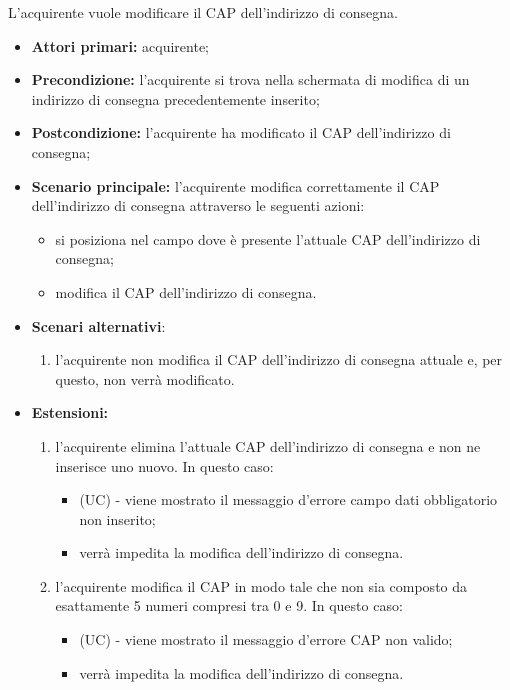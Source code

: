 L'acquirente vuole modificare il CAP dell'indirizzo di consegna.
\begin{itemize}
    \item \textbf{Attori primari:} acquirente;
    \item \textbf{Precondizione:} l'acquirente si trova nella schermata di modifica di un indirizzo di consegna precedentemente inserito;
    \item \textbf{Postcondizione:} l'acquirente ha modificato il CAP dell'indirizzo di consegna;
    \item \textbf{Scenario principale:} l'acquirente modifica correttamente il CAP dell'indirizzo di consegna attraverso le seguenti azioni:
    \begin{itemize}
        \item si posiziona nel campo dove è presente l'attuale CAP dell'indirizzo di consegna;
        \item modifica il CAP dell'indirizzo di consegna.
    \end{itemize}
    \item \textbf{Scenari alternativi}:
    \begin{enumerate}[label=\lett]
        \item l'acquirente non modifica il CAP dell'indirizzo di consegna attuale e, per questo, non verrà modificato.
    \end{enumerate}
    \item \textbf{Estensioni:}
    \begin{enumerate}[label=\lett]
        \item l'acquirente elimina l'attuale CAP dell'indirizzo di consegna e non ne inserisce uno nuovo. In questo caso:
        \begin{itemize}
            \item (UC) - viene mostrato il messaggio d'errore campo dati obbligatorio non inserito;
            \item verrà impedita la modifica dell'indirizzo di consegna.
        \end{itemize}
        \item l'acquirente modifica il CAP in modo tale che non sia composto da esattamente 5 numeri compresi tra 0 e 9. In questo caso:
        \begin{itemize}
            \item (UC) - viene mostrato il messaggio d'errore CAP non valido;
            \item verrà impedita la modifica dell'indirizzo di consegna.
        \end{itemize}
    \end{enumerate}
\end{itemize}

